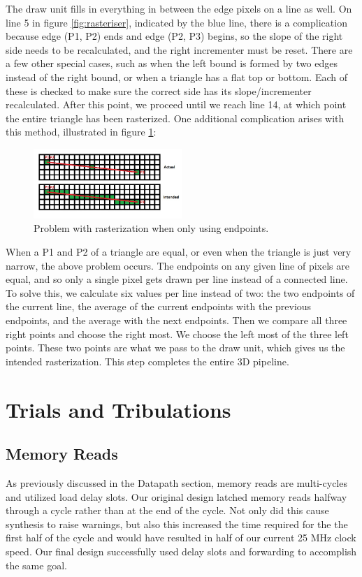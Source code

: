 \documentclass[onecolumn]{IEEEtran}
\begin{document}
The draw unit fills in everything in between the edge pixels on a line as well.  On line 5 in figure \ref{fig:rasteriser}, indicated by the blue line, there is a complication because edge (P1, P2) ends and edge (P2, P3) begins, so the slope of the right side needs to be recalculated, and the right incrementer must be reset.  There are a few other special cases, such as when the left bound is formed by two edges instead of the right bound, or when a triangle has a flat top or bottom.  Each of these is checked to make sure the correct side has its slope/incrementer recalculated.  After this point, we proceed until we reach line 14, at which point the entire triangle has been rasterized.  One additional complication arises with this method, illustrated in figure \ref{fig:rasterizerProblem}:

\begin{figure}[H]
	\centering
	\includegraphics[width=0.5\textwidth]{rasterizerProblem.png}
	\caption{Problem with rasterization when only using endpoints.}
	\label{fig:rasterizerProblem}
\end{figure}

When a P1 and P2 of a triangle are equal, or even when the triangle is just very narrow, the above problem occurs.  The endpoints on any given line of pixels are equal, and so only a single pixel gets drawn per line instead of a connected line.  To solve this, we calculate six values per line instead of two: the two endpoints of the current line, the average of the current endpoints with the previous endpoints, and the average with the next endpoints.  Then we compare all three right points and choose the right most.  We choose the left most of the three left points.  These two points are what we pass to the draw unit, which gives us the intended rasterization.  This step completes the entire 3D pipeline.  

\section{Trials and Tribulations}
\subsection{Memory Reads}
As previously discussed in the Datapath section, memory reads are multi-cycles and utilized load delay slots.  Our original design latched memory reads halfway through a cycle rather than at the end of the cycle.  Not only did this cause synthesis to raise warnings, but also this increased the time required for the the first half of the cycle and would have resulted in half of our current 25 MHz clock speed.  Our final design successfully used delay slots and forwarding to accomplish the same goal.
\end{document}

